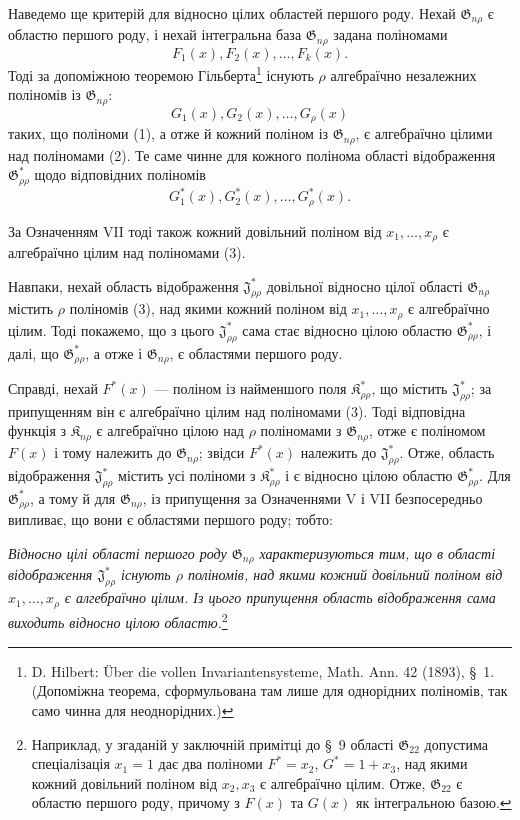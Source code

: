 \documentclass[11pt]{article}
\providecommand{\Kfield}{\mathfrak{K}}
\providecommand{\Jdom}{\mathfrak{J}}
\providecommand{\Gdom}{\mathfrak{G}}
\begin{document}
Наведемо ще критерій для відносно цілих областей першого роду. Нехай $\Gdom_{n\rho}$ є областю першого роду, і нехай інтегральна база $\Gdom_{n\rho}$ задана поліномами
\begin{equation}
  F_1(x),F_2(x),\ldots,F_k(x).
\tag{1}
\end{equation}
Тоді за допоміжною теоремою Гільберта\footnote{D. Hilbert: Über die vollen Invariantensysteme, Math. Ann. 42 (1893), \S\ 1. (Допоміжна теорема, сформульована там лише для однорідних поліномів, так само чинна для неоднорідних.)} існують $\rho$ алгебраїчно незалежних поліномів із $\Gdom_{n\rho}$:
\begin{equation}
  G_1(x),G_2(x),\ldots,G_\rho(x)
\tag{2}
\end{equation}
таких, що поліноми (1), а отже й кожний поліном із $\Gdom_{n\rho}$, є алгебраїчно цілими над поліномами (2). Те саме чинне для кожного полінома області відображення $\Gdom^*_{\rho\rho}$ щодо відповідних поліномів
\begin{equation}
  G_1^*(x),G_2^*(x),\ldots,G_\rho^*(x).
\tag{3}
\end{equation}

За Означенням VII тоді також кожний довільний поліном від $x_1,\ldots,x_\rho$ є алгебраїчно цілим над поліномами (3).

Навпаки, нехай область відображення $\Jdom^*_{\rho\rho}$ довільної відносно цілої області $\Gdom_{n\rho}$ містить $\rho$ поліномів (3), над якими кожний поліном від $x_1,\ldots,x_\rho$ є алгебраїчно цілим. Тоді покажемо, що з цього $\Jdom^*_{\rho\rho}$ сама стає відносно цілою областю $\Gdom^*_{\rho\rho}$, і далі, що $\Gdom^*_{\rho\rho}$, а отже і $\Gdom_{n\rho}$, є областями першого роду.

Справді, нехай $F^*(x)$ --- поліном із найменшого поля $\Kfield^*_{\rho\rho}$, що містить $\Jdom^*_{\rho\rho}$; за припущенням він є алгебраїчно цілим над поліномами (3). Тоді відповідна функція з $\Kfield_{n\rho}$ є алгебраїчно цілою над $\rho$ поліномами з $\Gdom_{n\rho}$, отже є поліномом $F(x)$ і тому належить до $\Gdom_{n\rho}$; звідси $F^*(x)$ належить до $\Jdom^*_{\rho\rho}$. Отже, область відображення $\Jdom^*_{\rho\rho}$ містить усі поліноми з $\Kfield^*_{\rho\rho}$ і є відносно цілою областю $\Gdom^*_{\rho\rho}$. Для $\Gdom^*_{\rho\rho}$, а тому й для $\Gdom_{n\rho}$, із припущення за Означеннями V і VII безпосередньо випливає, що вони є областями першого роду; тобто:

\emph{Відносно цілі області першого роду $\Gdom_{n\rho}$ характеризуються тим, що в області відображення $\Jdom^*_{\rho\rho}$ існують $\rho$ поліномів, над якими кожний довільний поліном від $x_1,\ldots,x_\rho$ є алгебраїчно цілим. Із цього припущення область відображення сама виходить відносно цілою областю.}\footnote{Наприклад, у згаданій у заключній примітці до \S\ 9 області $\Gdom_{22}$ допустима спеціалізація $x_1=1$ дає два поліноми $F^*=x_2$, $G^*=1+x_3$, над якими кожний довільний поліном від $x_2,x_3$ є алгебраїчно цілим. Отже, $\Gdom_{22}$ є областю першого роду, причому з $F(x)$ та $G(x)$ як інтегральною базою.}
\end{document}
